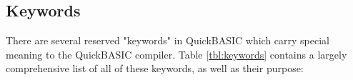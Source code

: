 \documentclass[10pt, reqno]{exam}
\begin{document}
\subsection{Keywords}

There are several reserved "keywords" in QuickBASIC which carry special meaning to the QuickBASIC compiler. Table \ref{tbl:keywords} contains a largely comprehensive list of all of these keywords, as well as their purpose: \par



\end{document}
